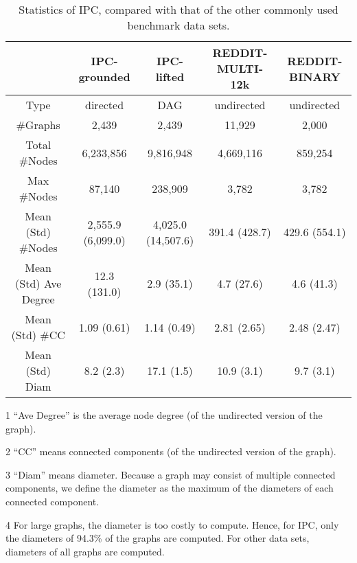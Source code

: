 \documentclass{article}
\begin{document}
\begin{table*}[ht]
\centering
\begin{threeparttable}
\caption{Statistics of IPC, compared with that of the other commonly used benchmark data sets.}
\label{tab:stat}
\centering
\begin{tabular}{ccccc}
\hline
& IPC-grounded & IPC-lifted & REDDIT-MULTI-12k & REDDIT-BINARY \\
\hline
Type          & directed & DAG & undirected & undirected \\
\#Graphs      & 2,439 & 2,439 & 11,929 & 2,000 \\
Total \#Nodes & 6,233,856 & 9,816,948 & 4,669,116 & 859,254 \\
Max \#Nodes   & 87,140 & 238,909 & 3,782 & 3,782 \\
Mean (Std) \#Nodes
              & 2,555.9 (6,099.0) & 4,025.0 (14,507.6) & 391.4 (428.7) & 429.6 (554.1) \\
Mean (Std) Ave Degree\tnote{1}
              & 12.3 (131.0) & 2.9 (35.1) & 4.7 (27.6) & 4.6 (41.3) \\
Mean (Std) \#CC\tnote{2}
              & 1.09 (0.61) & 1.14 (0.49) & 2.81 (2.65) & 2.48 (2.47) \\
Mean (Std) Diam\tnote{3,4}
              & 8.2 (2.3) & 17.1 (1.5) & 10.9 (3.1) & 9.7 (3.1) \\
\hline
\end{tabular}

\begin{tablenotes}
\item [1] ``Ave Degree'' is the average node degree (of the undirected version of the graph).
\item [2] ``CC'' means connected components (of the undirected version of the graph).
\item [3] ``Diam'' means diameter. Because a graph may consist of multiple connected components, we define the diameter as the maximum of the diameters of each connected component.
\item [4] For large graphs, the diameter is too costly to compute. Hence, for IPC, only the diameters of 94.3\% of the graphs are computed. For other data sets, diameters of all graphs are computed.
\end{tablenotes}


\end{threeparttable}
\end{table*}
\end{document}
